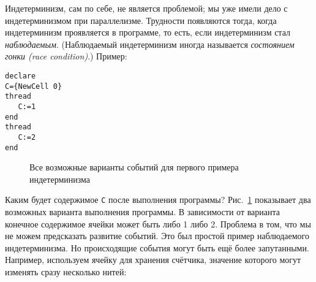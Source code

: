 Индетерминизм, сам по себе, не является проблемой; мы уже имели дело с индетерминизмом при параллелизме. Трудности появляются тогда, когда индетерминизм проявляется в программе, то есть, если индетерминизм стал \emph{наблюдаемым}. (Наблюдаемый индетерминизм иногда называется \emph{состоянием гонки (race condition)}.) Пример:

\begin{lstlisting}
declare
C={NewCell 0}
thread
   C:=1
end
thread
   C:=2
end
\end{lstlisting}


\newcommand\execsample[6]{
  \draw [->] (#1, #2) -- (#1 + 8, #2);
  \draw (#1 + 1, #2 - 1) -- (#1 + 1, #2 + 1);
  \node [above] at (#1 + 1, #2 + 1) {#3};

  \draw (#1 + 4, #2 - 1) -- (#1 + 4, #2 + 1);
  \node [above] at (#1 + 4, #2 + 1) {#4};

  \draw (#1 + 6, #2 - 1) -- (#1 + 6, #2 + 1);
  \node [above] at (#1 + 6, #2 + 1) {#5};

  \node [text width=6cm, right] at (#1 + 8, #2) {#6};
}


\begin{figure}
\caption{Все возможные варианты событий для первого примера индетерминизма}
\label{figure:Executions_first_nondeterm_example}
\end{figure}

Каким будет содержимое \lstinline|C| после выполнения программы? Рис.~\ref{figure:Executions_first_nondeterm_example} показывает два возможных варианта выполнения программы. В зависимости от варианта конечное содержимое ячейки может быть либо 1 либо 2. Проблема в том, что мы не можем предсказать развитие событий. Это был простой пример наблюдаемого индетерминизма. Но происходящие события могут быть ещё более запутанными. Например, используем ячейку для хранения счётчика, значение которого могут изменять сразу несколько нитей:

